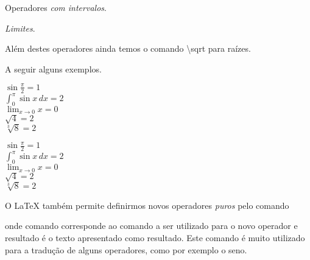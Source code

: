 \begin{table}[h!tb]
    \centering
    \caption{Operadores \textit{com intervalos}.}
    \label{tab:math_functions2}
    
\end{table}

\begin{table}[!htb]
    \centering
    \caption{\textit{Limites}.}
    \label{tab:math_functions3}
    
\end{table}

Além destes operadores ainda temos o comando \textbackslash\textsf{sqrt} para raízes.

A seguir alguns exemplos. \\
\begin{minipage}[t]{0.47\linewidth} \vspace{-8pt}
    \begin{latexcode}
        $\sin \frac{\pi}{2} = 1$ \\
        $\int_0^\pi \sin x \, dx = 2$ \\
        $\lim_{x \to 0} x = 0$ \\
        $\sqrt{4} = 2$ \\
        $\sqrt[3]{8} = 2$
    \end{latexcode}
\end{minipage} \hfill
\begin{minipage}[t]{0.47\linewidth} \vspace{0pt}
    $\sin \frac{\pi}{2} = 1$ \\
    $\int_0^\pi \sin x \, dx = 2$ \\
    $\lim_{x \to 0} x = 0$ \\
    $\sqrt{4} = 2$ \\
    $\sqrt[3]{8} = 2$
\end{minipage}

O LaTeX também permite definirmos novos operadores \textit{puros} pelo comando
\begin{latexcode}
    \DeclareMathOperator{comando}{resultado}
\end{latexcode}
onde \textsf{comando} corresponde ao comando a ser utilizado para o novo operador e \textsf{resultado} é o texto apresentado como resultado. Este comando é muito utilizado para a tradução de alguns operadores, como por exemplo o seno.

